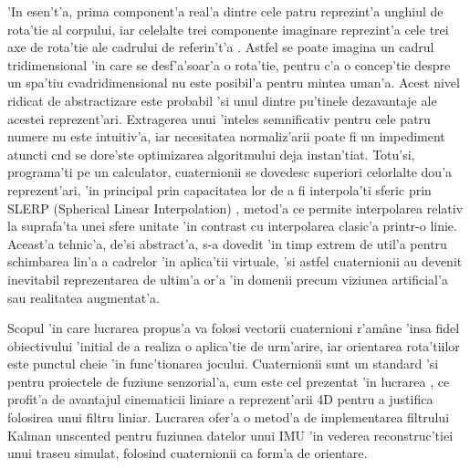 \documentclass[12pt,a4paper,twoside]{report}
\begin{document}
'In esen't'a, prima component'a real'a dintre cele patru reprezint'a unghiul de rota'tie al corpului, iar celelalte trei componente imaginare reprezint'a cele trei axe de rota'tie ale cadrului de referin't'a \cite{yetagainquats}. Astfel se poate imagina un cadrul tridimensional 'in care se desf'a'soar'a o rota'tie, pentru c'a o concep'tie despre un spa'tiu cvadridimensional nu este posibil'a pentru mintea uman'a. Acest nivel ridicat de abstractizare este probabil 'si unul dintre pu'tinele dezavantaje ale acestei reprezent'ari. Extragerea unui 'inteles semnificativ pentru cele patru numere nu este intuitiv'a, iar necesitatea normaliz'arii poate fi un impediment atuncti c\ia nd se dore'ste optimizarea algoritmului deja instan'tiat. Totu'si, programa'ti pe un calculator, cuaternionii se dovedesc superiori celorlalte dou'a reprezent'ari, 'in principal prin capacitatea lor de a fi interpola'ti sferic prin SLERP (Spherical Linear Interpolation) \cite{Jia2015QuaternionsAR}, metod'a ce permite interpolarea relativ la suprafa'ta unei sfere unitate 'in contrast cu interpolarea clasic'a printr-o linie. Aceast'a tehnic'a, de'si abstract'a, s-a dovedit 'in timp extrem de util'a pentru schimbarea lin'a a cadrelor 'in aplica'tii virtuale, 'si astfel cuaternionii au devenit inevitabil reprezentarea de ultim'a or'a 'in domenii precum viziunea artificial'a sau realitatea augmentat'a.

\vspace{5px}

Scopul 'in care lucrarea propus'a va folosi vectorii cuaternioni r'am\^{a}ne 'insa fidel obiectivului 'initial de a realiza o aplica'tie de urm'arire, iar orientarea rota'tiilor este punctul cheie 'in func'tionarea jocului. Cuaternionii sunt un standard 'si pentru proiectele de fuziune senzorial'a, cum este cel prezentat 'in lucrarea \cite{QuatKF}, ce profit'a de avantajul cinematicii liniare a reprezent'arii 4D pentru a justifica folosirea unui filtru liniar. Lucrarea \cite{1257247} ofer'a o metod'a de implementarea filtrului Kalman unscented pentru fuziunea datelor unui IMU 'in vederea reconstruc'tiei unui traseu simulat, folosind cuaternionii ca form'a de orientare.


\vspace{5px}
\end{document}
